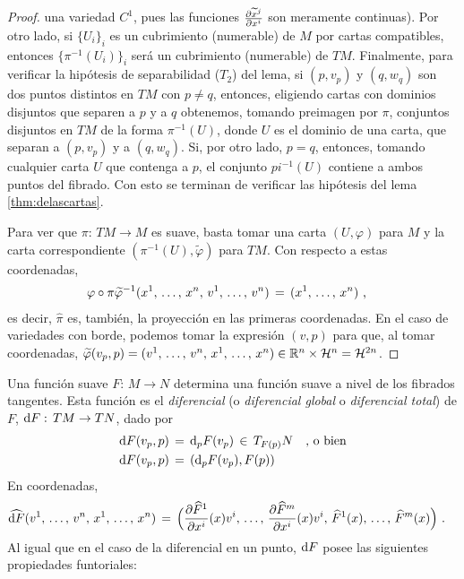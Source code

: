 \begin{proof}
	una variedad $C^{1}$, pues las funciones
	$\frac{\partial{\widetilde{x}^{j}}}{\partial{x^{i}}}$ son meramente continuas).
	Por otro lado, si $\{U_{i}\}_{i}$ es un cubrimiento (numerable) de $M$
	por cartas compatibles, entonces $\{\pi^{-1}(U_{i})\}_{i}$ ser\'{a}
	un cubrimiento (numerable) de $TM$. Finalmente, para verificar la
	hip\'{o}tesis de separabilidad ($T_{2}$) del lema, si $(p,v_{p})$ y
	$(q,w_{q})$ son dos puntos distintos en $TM$ con $p\not =q$,
	entonces, eligiendo cartas con dominios disjuntos que separen a
	$p$ y a $q$ obtenemos, tomando preimagen por $\pi$, conjuntos
	disjuntos en $TM$ de la forma $\pi^{-1}(U)$, donde $U$ es el dominio
	de una carta, que separan a $(p,v_{p})$ y a $(q,w_{q})$. Si, por
	otro lado, $p=q$, entonces, tomando cualquier carta $U$ que
	contenga a $p$, el conjunto $pi^{-1}(U)$ contiene a ambos puntos
	del fibrado. Con esto se terminan de verificar las hip\'{o}tesis
	del lema \ref{thm:delascartas}.

	Para ver que $\pi:\,TM\rightarrow M$ es suave, basta tomar una
	carta $(U,\varphi)$ para $M$ y la carta correspondiente
	$(\pi^{-1}(U),\widetilde{\varphi})$ para $TM$. Con respecto a estas
	coordenadas,
	\begin{align*}
		\varphi\circ\pi\widetilde{\varphi}^{-1}
			(\lista*{x}{n},\,\lista*{v}{n}) & \,=\,(\lista*{x}{n})
		\text{ ,}
	\end{align*}
	es decir, $\widehat{\pi}$ es, tambi\'{e}n, la proyecci\'{o}n en las
	primeras coordenadas. En el caso de variedades con borde, podemos
	tomar la expresi\'{o}n $(v,p)$ para que, al tomar coordenadas,
	$\widetilde{\varphi}(v_{p},p)=(\lista*{v}{n},\,\lista*{x}{n})\in %
	\bb{R}^{n}\times\hemi[n]=\hemi[2n]$.
\end{proof}

Una funci\'{o}n suave $F:\,M\rightarrow N$ determina una funci\'{o}n suave a
nivel de los fibrados tangentes. Esta funci\'{o}n es el \emph{diferencial}
(o \emph{diferencial global} o \emph{diferencial total}) de $F$,
$\diferencial{F}:\,TM\rightarrow TN$, dado por
\begin{align*}
	\diferencial{F}(v_{p},p) & \,=\,\diferencial[p]{F}(v_{p})\,\in\,
		T_{F(p)}N\quad\text{, o bien} \\
	\diferencial{F}(v_{p},p) & \,=\,(\diferencial[p]{F}(v_{p}),F(p))
\end{align*}
%
En coordenadas,
\begin{align*}
	\widehat{\diferencial{F}}(\lista*{v}{n},\,\lista*{x}{n}) & \,=\,
		\Big(
		\derivada{\widehat{F}^{1}}{x^{i}}(x)v^{i},\,\dots,\,
		\derivada{\widehat{F}^{m}}{x^{i}}(x)v^{i},\,
		\widehat{F}^{1}(x),\,\dots,\,\widehat{F}^{m}(x)
		\Big)
		\text{ .}
\end{align*}
%
Al igual que en el caso de la diferencial en un punto, $\diferencial{F}$
posee las siguientes propiedades funtoriales:

